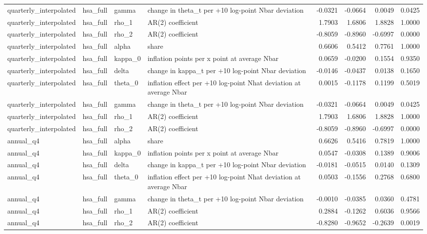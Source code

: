 \begin{tabular}{llllrrrr}
quarterly\_interpolated & hsa\_full & gamma & change in theta\_t per +10 log-point Nbar deviation & -0.0321 & -0.0664 & 0.0049 & 0.0425 \\
quarterly\_interpolated & hsa\_full & rho\_1 & AR(2) coefficient & 1.7903 & 1.6806 & 1.8828 & 1.0000 \\
quarterly\_interpolated & hsa\_full & rho\_2 & AR(2) coefficient & -0.8059 & -0.8960 & -0.6997 & 0.0000 \\
quarterly\_interpolated & hsa\_full & alpha & share & 0.6606 & 0.5412 & 0.7761 & 1.0000 \\
quarterly\_interpolated & hsa\_full & kappa\_0 & inflation points per x point at average Nbar & 0.0659 & -0.0200 & 0.1554 & 0.9350 \\
quarterly\_interpolated & hsa\_full & delta & change in kappa\_t per +10 log-point Nbar deviation & -0.0146 & -0.0437 & 0.0138 & 0.1650 \\
quarterly\_interpolated & hsa\_full & theta\_0 & inflation effect per +10 log-point Nhat deviation at average Nbar & 0.0015 & -0.1178 & 0.1199 & 0.5019 \\
quarterly\_interpolated & hsa\_full & gamma & change in theta\_t per +10 log-point Nbar deviation & -0.0321 & -0.0664 & 0.0049 & 0.0425 \\
quarterly\_interpolated & hsa\_full & rho\_1 & AR(2) coefficient & 1.7903 & 1.6806 & 1.8828 & 1.0000 \\
quarterly\_interpolated & hsa\_full & rho\_2 & AR(2) coefficient & -0.8059 & -0.8960 & -0.6997 & 0.0000 \\
annual\_q4 & hsa\_full & alpha & share & 0.6626 & 0.5416 & 0.7819 & 1.0000 \\
annual\_q4 & hsa\_full & kappa\_0 & inflation points per x point at average Nbar & 0.0547 & -0.0308 & 0.1389 & 0.9006 \\
annual\_q4 & hsa\_full & delta & change in kappa\_t per +10 log-point Nbar deviation & -0.0181 & -0.0515 & 0.0140 & 0.1309 \\
annual\_q4 & hsa\_full & theta\_0 & inflation effect per +10 log-point Nhat deviation at average Nbar & 0.0503 & -0.1556 & 0.2768 & 0.6800 \\
annual\_q4 & hsa\_full & gamma & change in theta\_t per +10 log-point Nbar deviation & -0.0010 & -0.0385 & 0.0360 & 0.4781 \\
annual\_q4 & hsa\_full & rho\_1 & AR(2) coefficient & 0.2884 & -0.1262 & 0.6036 & 0.9566 \\
annual\_q4 & hsa\_full & rho\_2 & AR(2) coefficient & -0.8280 & -0.9652 & -0.2639 & 0.0019 \\

\end{tabular}
